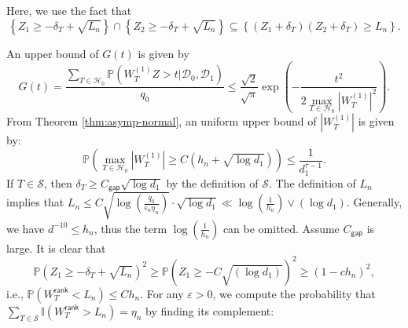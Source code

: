 \documentclass[12pt]{article}
\newcommand{\abs}[1]{\left\lvert#1\right\rvert}
\newcommand{\PP}{\mathbb{P}}
\newcommand{\cH}{\mathcal{H}}
\newcommand{\cD}{\mathcal{D}}
\newcommand{\cS}{\mathcal{S}}
\newcommand{\bbI}{\mathbb{I}}
\def\PP{{\mathbb P}}
\theoremstyle{plain}
\begin{document}
Here, we use the fact that
\begin{equation*}
    \left\{ Z_1\ge -\delta_T+\sqrt{L_n} \right\} \cap \left\{ Z_2\ge -\delta_T+\sqrt{L_n} \right\} \subseteq \left\{(Z_1+\delta_T)(Z_2+\delta_T) \ge L_n \right\}.
\end{equation*}
 
An upper bound of $G(t)$ is given by 
\begin{equation*}
    G(t)= \frac{\sum_{T\in\cH_0 } \PP( {W}^{(1)}_{T} Z > t |\cD_0,\cD_1 )   }{q_0}\le \frac{\sqrt{2}}{\sqrt{\pi}} \exp{\left( -\frac{t^2}{ 2\max_{T\in\cH_0} \abs{{W}^{(1)}_{T} }^2 } \right)}.
\end{equation*}
From Theorem \ref{thm:asymp-normal}, an uniform upper bound of $\abs{{W}^{(1)}_{T} }$ is given by:
\begin{equation*}
    \PP\left(\max_{T\in\cH_0}\abs{{W}^{(1)}_{T} } \ge C(h_n +\sqrt{\log d_1 })  \right)\le \frac{1}{d_1^{\tau-1} }.
\end{equation*}
If $T\in \cS$, then $\delta_T\ge C_{\mathsf{gap}} \sqrt{\log d_1} $ by the definition of $\cS$. The definition of $L_n$ implies that $L_n  \le C \sqrt{\log(\frac{q_0}{\epsilon_n \eta_n})}\cdot  \sqrt{\log d_1} \ll \log(\frac{1}{h_n})\vee (\log d_1) $. Generally, we have $d^{-10}\le h_n$, thus the term $\log (\frac{1}{h_n})$ can be omitted. Assume $C_{\mathsf{gap}}$ is large. It is clear that 
\begin{equation*}
    \PP\left( Z_1\ge -\delta_T+\sqrt{L_n} \right)^2\ge  \PP\left( Z_1\ge -C\sqrt{ (\log d_1) }  \right)^2\ge (1- c h_n)^2,
\end{equation*}
i.e., $\PP(W_T^\mathsf{rank}< L_n ) \le C h_n$.  For any $\varepsilon>0$, we compute the probability that $\sum\limits_{T\in\cS} \bbI(W_T^\mathsf{rank}> L_n)=\eta_n$ by finding its complement:
\end{document}
